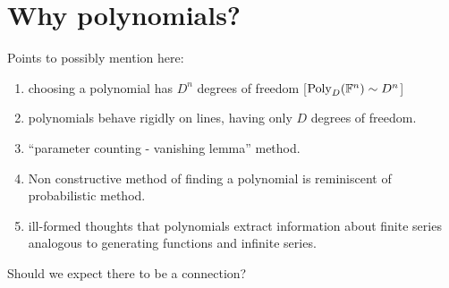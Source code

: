 \section{Why polynomials?}

Points to possibly mention here:
\begin{enumerate}
    \item choosing a polynomial has $D^n$ degrees of freedom [$\text{Poly}_D(\mathbb F^n) \sim D^n$]
    \item polynomials behave rigidly on lines, having only $D$ degrees of freedom.
    \item ``parameter counting - vanishing lemma'' method. 
    \item Non constructive method of finding a polynomial is reminiscent of probabilistic method.\cite{GOW2020} \cite{GUTH2016}
    \item ill-formed thoughts that polynomials extract information about finite series analogous to generating functions and infinite series. 
\end{enumerate}

Should we expect there to be a connection?

